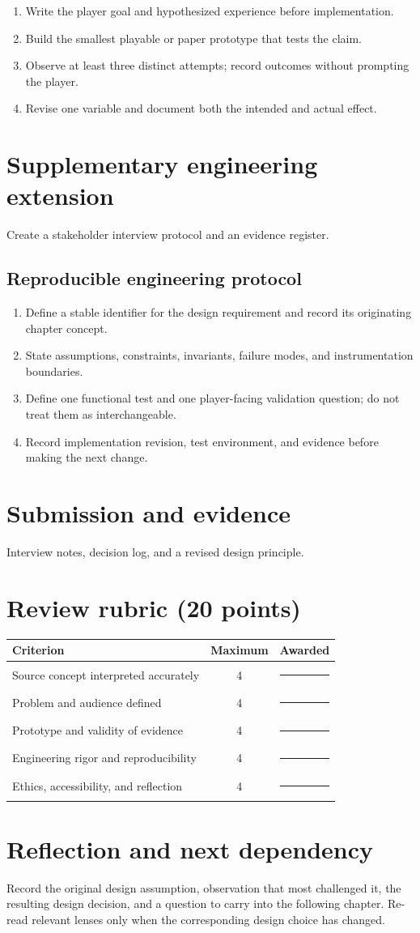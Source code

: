 \documentclass[11pt]{article}
\begin{document}
\begin{enumerate}
\item Write the player goal and hypothesized experience before implementation.
\item Build the smallest playable or paper prototype that tests the claim.
\item Observe at least three distinct attempts; record outcomes without prompting the player.
\item Revise one variable and document both the intended and actual effect.
\end{enumerate}

\section{Supplementary engineering extension}
Create a stakeholder interview protocol and an evidence register.


\subsection{Reproducible engineering protocol}
\begin{enumerate}
\item Define a stable identifier for the design requirement and record its originating chapter concept.
\item State assumptions, constraints, invariants, failure modes, and instrumentation boundaries.
\item Define one functional test and one player-facing validation question; do not treat them as interchangeable.
\item Record implementation revision, test environment, and evidence before making the next change.
\end{enumerate}

\section{Submission and evidence}
Interview notes, decision log, and a revised design principle.


\section{Review rubric (20 points)}
\begin{tabularx}{\linewidth}{@{}Xcc@{}}\toprule
Criterion & Maximum & Awarded \\ \midrule
Source concept interpreted accurately & 4 & \rule{0.45in}{0.4pt}\\
Problem and audience defined & 4 & \rule{0.45in}{0.4pt}\\
Prototype and validity of evidence & 4 & \rule{0.45in}{0.4pt}\\
Engineering rigor and reproducibility & 4 & \rule{0.45in}{0.4pt}\\
Ethics, accessibility, and reflection & 4 & \rule{0.45in}{0.4pt}\\\bottomrule
\end{tabularx}

\section{Reflection and next dependency}
Record the original design assumption, observation that most challenged it, the resulting design decision, and a question to carry into the following chapter. Re-read relevant lenses only when the corresponding design choice has changed.
\end{document}
